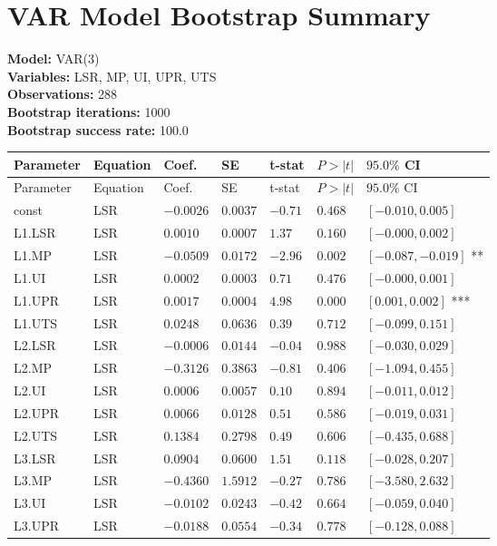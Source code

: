 \documentclass{article}
\begin{document}
\section*{VAR Model Bootstrap Summary}
\textbf{Model:} VAR(3)\\
\textbf{Variables:} LSR, MP, UI, UPR, UTS\\
\textbf{Observations:} 288\\
\textbf{Bootstrap iterations:} 1000\\
\textbf{Bootstrap success rate:} 100.0%
\bigskip
\begin{longtable}{lllllll}
\toprule
Parameter & Equation & Coef. & SE & t-stat & $P{>}|t|$ & $95.0\%$ CI \\
\midrule
\endfirsthead
\toprule
Parameter & Equation & Coef. & SE & t-stat & $P{>}|t|$ & $95.0\%$ CI \\
\midrule
\endhead
const & LSR & $-0.0026$ & $0.0037$ & $-0.71$ & $0.468$ & $[-0.010, 0.005]$  \\
L1.LSR & LSR & $0.0010$ & $0.0007$ & $1.37$ & $0.160$ & $[-0.000, 0.002]$  \\
L1.MP & LSR & $-0.0509$ & $0.0172$ & $-2.96$ & $0.002$ & $[-0.087, -0.019]$ ** \\
L1.UI & LSR & $0.0002$ & $0.0003$ & $0.71$ & $0.476$ & $[-0.000, 0.001]$  \\
L1.UPR & LSR & $0.0017$ & $0.0004$ & $4.98$ & $0.000$ & $[0.001, 0.002]$ *** \\
L1.UTS & LSR & $0.0248$ & $0.0636$ & $0.39$ & $0.712$ & $[-0.099, 0.151]$  \\
L2.LSR & LSR & $-0.0006$ & $0.0144$ & $-0.04$ & $0.988$ & $[-0.030, 0.029]$  \\
L2.MP & LSR & $-0.3126$ & $0.3863$ & $-0.81$ & $0.406$ & $[-1.094, 0.455]$  \\
L2.UI & LSR & $0.0006$ & $0.0057$ & $0.10$ & $0.894$ & $[-0.011, 0.012]$  \\
L2.UPR & LSR & $0.0066$ & $0.0128$ & $0.51$ & $0.586$ & $[-0.019, 0.031]$  \\
L2.UTS & LSR & $0.1384$ & $0.2798$ & $0.49$ & $0.606$ & $[-0.435, 0.688]$  \\
L3.LSR & LSR & $0.0904$ & $0.0600$ & $1.51$ & $0.118$ & $[-0.028, 0.207]$  \\
L3.MP & LSR & $-0.4360$ & $1.5912$ & $-0.27$ & $0.786$ & $[-3.580, 2.632]$  \\
L3.UI & LSR & $-0.0102$ & $0.0243$ & $-0.42$ & $0.664$ & $[-0.059, 0.040]$  \\
L3.UPR & LSR & $-0.0188$ & $0.0554$ & $-0.34$ & $0.778$ & $[-0.128, 0.088]$  \\

\end{longtable}
\end{document}
